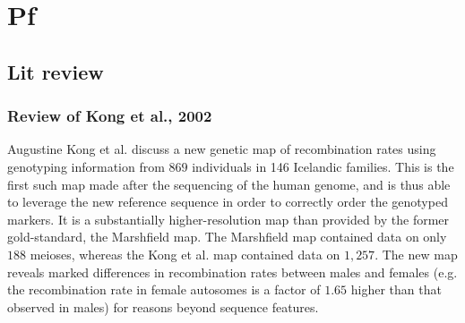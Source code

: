 \chapter{Pf}
\label{ch:pf}

\section{Lit review}
\subsection{Review of Kong et al., 2002}

Augustine Kong et al. discuss a new genetic map of recombination rates using genotyping information from $869$ individuals in 146 Icelandic families.  This is the first such map made after the sequencing of the human genome, and is thus able to leverage the new reference sequence in order to correctly order the genotyped markers.  It is a substantially higher-resolution map than provided by the former gold-standard, the Marshfield map.  The Marshfield map contained data on only $188$ meioses, whereas the Kong et al. map contained data on $1,257$.  The new map reveals marked differences in recombination rates between males and females (e.g. the recombination rate in female autosomes is a factor of $1.65$ higher than that observed in males) for reasons beyond sequence features.

